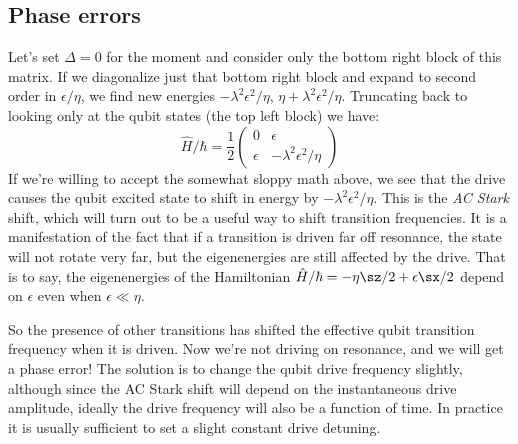 \subsection{Phase errors}
\label{sec:qutritPhaseError}
Let's set $\Delta = 0$ for the moment and consider only the bottom right block of this matrix. If we diagonalize just that bottom right block and expand to second order in $\epsilon/\eta$, we find new energies $-\lambda^2\epsilon^2/\eta$, $\eta + \lambda^2\epsilon^2/\eta$. Truncating back to looking only at the qubit states (the top left block) we have:
\begin{equation*}
    \hat{H}/\hbar = \frac{1}{2}\begin{pmatrix}
        0 & \epsilon \\ 
        \epsilon & -\lambda^2\epsilon^2/\eta
    \end{pmatrix}
\end{equation*}
If we're willing to accept the somewhat sloppy math above, we see that the drive causes the qubit excited state to shift in energy by $-\lambda^2\epsilon^2/\eta$. This is the \textit{AC Stark} shift, which will turn out to be a useful way to shift transition frequencies. It is a manifestation of the fact that if a transition is driven far off resonance, the state will not rotate very far, but the eigenenergies are still affected by the drive. That is to say, the eigenenergies of the Hamiltonian $\hat{H}/\hbar=-\eta\sz/2 +\epsilon\sx/2$ depend on $\epsilon$ even when $\epsilon \ll \eta$. 

So the presence of other transitions has shifted the effective qubit transition frequency when it is driven. Now we're not driving on resonance, and we will get a phase error! The solution is to change the qubit drive frequency slightly, although since the AC Stark shift will depend on the instantaneous drive amplitude, ideally the drive frequency will also be a function of time. In practice it is usually sufficient to set a slight constant drive detuning.


